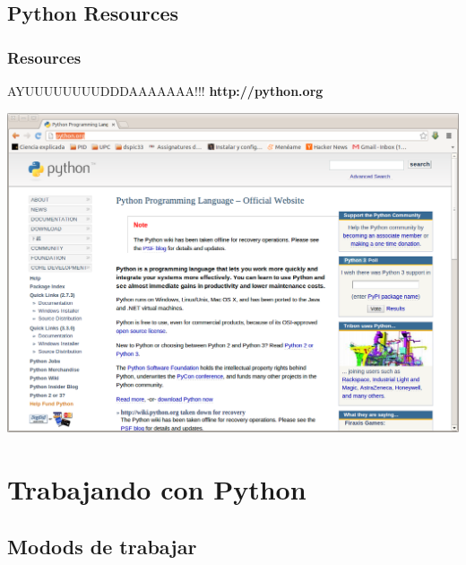 \documentclass[10pt,colorlinks]{beamer}
\begin{document}
\subsection{Python Resources}
\begin{frame}[fragile]\frametitle{Resources}
\begin{block}{AYUUUUUUUUDDDAAAAAAA!!!}
\textbf{http://python.org}
\begin{center}
\includegraphics[scale=0.15]{figs/python__org.jpg}
\end{center}  
\end{block}
  
\end{frame}


\section{Trabajando con Python}

\subsection{Modods de trabajar}
\end{document}

